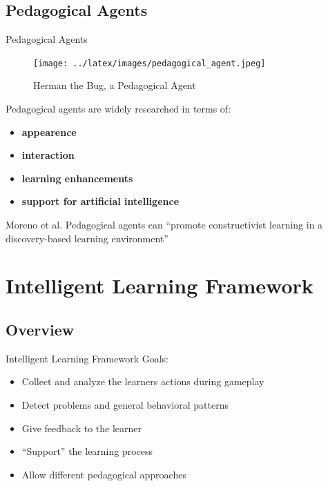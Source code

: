 \documentclass[compress]{beamer}
\begin{document}
\subsection{Pedagogical Agents}
\begin{frame}[allowframebreaks]{Pedagogical Agents}
\begin{figure}[t]
    \centering
    \texttt{[image: ../latex/images/pedagogical\_agent.jpeg]}
    \caption[Herman the Bug, a Pedagogical Agent]
    {Herman the Bug, a Pedagogical Agent \cite{Lester1997c}}
\end{figure}
\end{frame}

\begin{frame}%
\begin{block}{Pedagogical agents are widely researched in terms of:}
\begin{itemize}
\pause
\item \textbf{appearence} \cite{Johnson2000, Slater2000a, Voerman1997a}
\pause
\item \textbf{interaction} \cite{Slater2000a, Baylor2003b}
\pause
\item \textbf{learning enhancements} \cite{Conati2004b, Baylor2003b, Blanchard2004b, Voerman1997a}
\pause
\item \textbf{support for artificial intelligence} \cite{Nunes2002b}
\end{itemize}
\end{block}

\pause

\begin{block}{Moreno et al.}
Pedagogical agents can ``promote constructivist learning in a
discovery-based learning environment''\cite{Moreno2000a}
\end{block}
\end{frame}

\section{Intelligent Learning Framework}
\subsection{Overview}

\begin{frame}{Intelligent Learning Framework}
\pause
Goals:
\begin{itemize}
\item Collect and analyze the learners actions during gameplay
\item Detect problems and general behavioral patterns
\pause
\item Give feedback to the learner
\item ``Support'' the learning process
\item Allow different pedagogical approaches
\end{itemize}
\end{frame}
\end{document}
